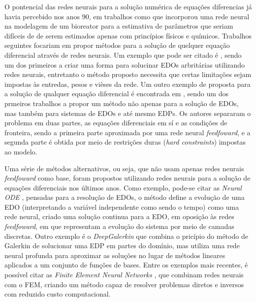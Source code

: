 O pontencial das redes neurais para a solução numérica de equações diferencias 
já havia percebido nos anos 90, em trabalhos como \cite{psichogios-etal:92} que
incorporou uma rede neural na modelagem de um bioreator para a estimativa de
parâmetros que seriam difíceis de de serem estimados apenas com princípios físicos 
e químicos. Trabalhos seguintes focariam em propor métodos para a solução de 
quelquer equação diferencial através de redes neurais. 
Um exemplo que pode ser citado é \cite{meade-fernandez:94}, sendo um dos 
primeiros a criar uma forma para solucinar EDOs arbritárias utilizando redes 
neurais, entretanto o método proposto necessita que certas limitações sejam
impostas às entredas, pesos e vièses da rede. 
Um outro exemplo de proposta para a solução de qualquer equação diferencial é
encontrada  em \cite{lagaris-etal:98}, sendo um dos prmeiros trabalhos a 
propor um método não apenas para a solução de EDOs, mas também para sistemas 
de EDOs e até mesmo EDPs.
Os autores separaram o problema em duas partes, as equações diferenciais em sí e 
as condições de fronteira, sendo a primeira parte aproximada por uma rede neural
\textit{feedfoward}, e a segunda parte é obtida por meio de restrições duras 
(\textit{hard constraints}) impostas ao modelo.

Uma série de métodos alternativos, ou seja, que não usam apenas redes neurais 
\textit{feedfoward} como base, foram propostos utilizando redes neurais para
a solução de equações diferenciais nos últimos anos. 
Como exemplo, pode-se citar as \textit{Neural ODE} \cite{chen-etal:2018-neural-ode}, 
pensadas para a resolução de EDOs, o método define a evolução de uma EDO 
(interpretando a variável independente como sendo o tempo) como uma rede neural,
criado uma solução continua para a EDO, em oposição às redes \textit{feedfoward},
em que representam a evolução do sistema por meio de camadas discretas.  
Outro exemplo é o \textit{DeepGalerkin} \cite{sirignano-spiliopoulos:2018-deepgalerkin}
que combina o pricípio do método de Galerkin de solucionar uma EDP em partes do
domínio, mas utiliza uma rede neural profunda para aproximar as soluções no lugar 
de métodos lineares aplicados a um conjunto de funções de bases.
Entre os exemplos mais recentes, é possível citar as 
\textit{Finite Element Neural Networks} \cite{mitusch:2021-hybrid-fem-nn}, 
que combinam redes neurais com o FEM, criando um método capaz de resolver problemas
diretos e inversos com reduzido custo computacional.

